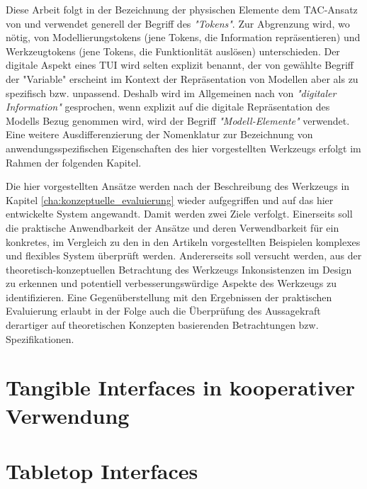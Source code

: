 Diese Arbeit folgt in der Bezeichnung der physischen Elemente dem TAC-Ansatz von \citep{Shaer04} und verwendet generell der Begriff des \emph{"Tokens"}. Zur Abgrenzung wird, wo nötig, von Modellierungstokens (jene Tokens, die Information repräsentieren) und Werkzeugtokens (jene Tokens, die Funktionlität auslösen) unterschieden. Der digitale Aspekt eines \gls{TUI} wird selten explizit benannt, der von \citep{Shaer04} gewählte Begriff der "Variable" erscheint im Kontext der Repräsentation von Modellen aber als zu spezifisch bzw. unpassend. Deshalb wird im Allgemeinen nach \citep{Ishii08} von \emph{"digitaler Information"} gesprochen, wenn explizit auf die digitale Repräsentation des Modells Bezug genommen wird, wird der Begriff \emph{"Modell-Elemente"} verwendet. Eine weitere Ausdifferenzierung der Nomenklatur zur Bezeichnung von anwendungsspezifischen Eigenschaften des hier vorgestellten Werkzeugs erfolgt im Rahmen der folgenden Kapitel.

Die hier vorgestellten Ansätze werden nach der Beschreibung des Werkzeugs in Kapitel \ref{cha:konzeptuelle_evaluierung} wieder aufgegriffen und auf das hier entwickelte System angewandt. Damit werden zwei Ziele verfolgt. Einerseits soll die praktische Anwendbarkeit der Ansätze und deren Verwendbarkeit für ein konkretes, im Vergleich zu den in den Artikeln vorgestellten Beispielen komplexes und flexibles System überprüft werden. Andererseits soll versucht werden, aus der theoretisch-konzeptuellen Betrachtung des Werkzeugs Inkonsistenzen im Design zu erkennen und potentiell verbesserungswürdige Aspekte des Werkzeugs zu identifizieren. Eine Gegenüberstellung mit den Ergebnissen der praktischen Evaluierung erlaubt in der Folge auch die Überprüfung des Aussagekraft derartiger auf theoretischen Konzepten basierenden Betrachtungen bzw. Spezifikationen.



\section{Tangible Interfaces in kooperativer Verwendung} %
\label{sub:tangible_interfaces_in_kooperativer_verwendung}
\citep{Hornecker04}


\section{Tabletop Interfaces} %
\label{sec:tabletop_interfaces}

